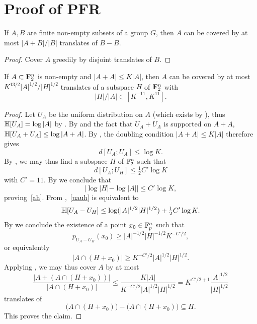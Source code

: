 \chapter{Proof of PFR}

\begin{lemma}
\label{ruz-cov}
\leanok
If $A,B$ are finite non-empty subsets of a group $G$, then $A$ can be covered by at most $|A+B|/|B|$ translates of $B-B$.
\end{lemma}
\begin{proof}
\leanok
Cover $A$ greedily by disjoint translates of $B$.
\end{proof}

\begin{lemma}\label{pfr_aux}
  \leanok If $A \subset {\bf F}_2^n$ is non-empty and
  $|A+A| \leq K|A|$, then $A$ can be covered by at most $K ^
  {13/2}|A|^{1/2}/|H|^{1/2}$ translates of a subspace $H$ of ${\bf F}_2^n$ with
  \begin{equation}
    \label{ah}
    |H|/|A| \in [K^{-11}, K^{11}].
  \end{equation}
  \end{lemma}

\begin{proof}
\leanok
  Let $U_A$ be the uniform distribution on $A$ (which exists by ), thus $\mathbb{H}[U_A] = \log |A|$ by . By  and the fact that $U_A + U_A$ is supported on $A + A$, $\mathbb{H}[U_A + U_A] \leq \log|A+A|$. By , the doubling condition $|A+A| \leq K|A|$ therefore gives
  \[d[U_A;U_A] \leq \log K.\]
  By , we may thus find a subspace $H$ of $\mathbb{F}_2^n$ such that
  \begin{equation}\label{uauh} d[U_A;U_H] \leq \tfrac{1}{2} C' \log K\end{equation}
  with $C' = 11$.
  By  we conclude that
  \begin{equation*}
    |\log |H| - \log |A|| \leq C' \log K,
  \end{equation*}
  proving~\eqref{ah}.
  From ,~\eqref{uauh} is equivalent to
  \[\mathbb{H}[U_A - U_H] \leq \log( |A|^{1/2} |H|^{1/2}) + \tfrac{1}{2} C' \log K.\]
  By  we conclude the existence of a point $x_0 \in \mathbb{F}_p^n$ such that
  \[p_{U_A-U_H}(x_0) \geq |A|^{-1/2} |H|^{-1/2} K^{-C'/2},\]
  or equivalently
  \[|A \cap (H + x_0)| \geq K^{-C'/2} |A|^{1/2} |H|^{1/2}.\]
  Applying , we may thus cover $A$ by at most
  \[\frac{|A + (A \cap (H+x_0))|}{|A \cap (H + x_0)|} \leq \frac{K|A|}{K^{-C'/2} |A|^{1/2} |H|^{1/2}} = K^{C'/2+1} \frac{|A|^{1/2}}{|H|^{1/2}}\]
  translates of
  \[\bigl(A \cap (H + x_0)\bigr) - \bigl(A \cap (H + x_0)\bigr) \subseteq H.\]
  This proves the claim.
\end{proof}



